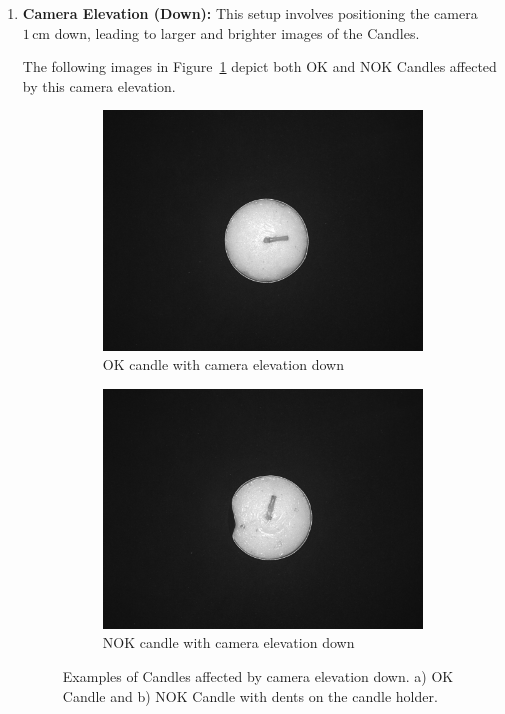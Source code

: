 \documentclass[12pt,DIV14,BCOR12mm,a4paper,footinclude=false,headinclude,parskip=half-,twoside,openright,cleardoublepage=empty,toc=index,bibliography=totoc,listof=totoc]{scrreprt}
\numberwithin{equation}{chapter}
\begin{document}
\begin{enumerate}
	\item \textbf{Camera Elevation (Down):} This setup involves positioning the camera $1\,\mathrm{cm}$ down, leading to larger and brighter images of the Candles. 

The following images in Figure~\ref{fig:camera_elevation_down} depict both OK and NOK Candles affected by this camera elevation.

	\begin{figure}
		\centering
		\begin{subfigure}[b]{0.45\textwidth}
			\centering
			\includegraphics[scale=0.15]{../media/Candles-influence-camera-down-OK.png}
			\caption{OK candle with camera elevation down}
		\end{subfigure}
		\hfill
		\begin{subfigure}[b]{0.45\textwidth}
			\centering
			\includegraphics[scale=0.15]{../media/Candles-influence-camera-down-NOK.png}
			\caption{NOK candle with camera elevation down}
		\end{subfigure}
		\caption{Examples of Candles affected by camera elevation down. a) OK Candle and b) NOK Candle with dents on the candle holder.}
		\label{fig:camera_elevation_down}
	\end{figure}
	

\end{enumerate}
\end{document}
